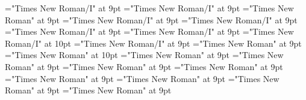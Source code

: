 \documentclass[gps1,twoside]{article}
\begin{document}
\font\spanexampleexampleexamplessensesensessensesensessubentrysubentriesentrylastchildafterexampleexamplespansensespanspandiventryletData="Times New Roman/I" at 9pt
\font\spanexampleexampleexamplessensesensessensesensessubentrysubentriesentryexamplespansensespanspandiventryletData="Times New Roman/I" at 9pt
\font\spanexampleexampleexamplessensesensessensesensessubentrysubentriesentrylastchildafterexamplespansensespanspandiventryletData="Times New Roman" at 9pt
\font\translationspanexampleexampleexamplessensesensessensesensessubentrysubentriesentryexamplespansensespanspandiventryletData="Times New Roman/I" at 9pt
\font\translationafterspanexampleexampleexamplessensesensessensesensessubentrysubentriesentryexamplespansensespanspandiventryletData="Times New Roman/I" at 9pt
\font\translationtranslationspanexampleexampleexamplessensesensessensesensessubentrysubentriesentryexamplespansensespanspandiventryletData="Times New Roman/I" at 9pt
\font\translationaftertranslationspanexampleexampleexamplessensesensessensesensessubentrysubentriesentryexamplespansensespanspandiventryletData="Times New Roman/I" at 9pt
\font\spanentranslationtranslationspanexampleexampleexamplessensesensessensesensessubentrysubentriesentryexamplespansensespanspandiventryletData="Times New Roman/I" at 10pt
\font\spantranslationtranslationtranslationsexampleexamplessensesensessensesensessubentrysubentriesentrylastchildaftertranslationtranslationspanexampleexampleexamplessensesensessensesensessubentrysubentriesentryexamplespansensespanspandiventryletData="Times New Roman/I" at 9pt
\font\spanspanspansensespanspandiventryletData="Times New Roman" at 9pt
\font\spanenspanspanspansensespanspandiventryletData="Times New Roman" at 10pt
\font\spanabbreviationsemanticdomainsemanticdomainssensesensessensesensessubentrysubentriesentrylastchildafterspanspanspansensespanspandiventryletData="Times New Roman" at 9pt
\font\spannameacademicdomainacademicdomainssensesensessensesensessubentrysubentriesentryfirstchildbeforespanspanspansensespanspandiventryletData="Times New Roman" at 9pt
\font\spannameacademicdomainacademicdomainssensesensessensesensessubentrysubentriesentrylastchildafterspanspanspansensespanspandiventryletData="Times New Roman" at 9pt
\font\picturesentryafterdiventryletData="Times New Roman" at 9pt
\font\picturepicturesentryspandiventryletData="Times New Roman" at 9pt
\font\picturepicturessubentrysubentriesentrypicturepicturesentryspandiventryletData="Times New Roman" at 9pt
\font\picturepicturessubentrysubentriesentryafterpicturepicturesentryspandiventryletData="Times New Roman" at 9pt
\font\sensenumberpicturepicturesentryspandiventryletData="Times New Roman" at 9pt
\end{document}
